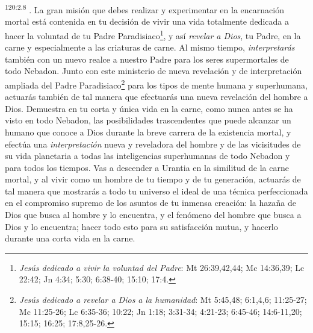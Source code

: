 \par 
\textsuperscript{120:2.8} . La gran misión que debes realizar y experimentar en la encarnación mortal está contenida en tu decisión de vivir una vida totalmente dedicada a hacer la voluntad de tu Padre Paradisiaco\footnote{\textit{Jesús dedicado a vivir la voluntad del Padre}: Mt 26:39,42,44; Mc 14:36,39; Lc 22:42; Jn 4:34; 5:30; 6:38-40; 15:10; 17:4.}, y así \textit{revelar a Dios}, tu Padre, en la carne y especialmente a las criaturas de carne. Al mismo tiempo, \textit{interpretarás} también con un nuevo realce a nuestro Padre para los seres supermortales de todo Nebadon. Junto con este ministerio de nueva revelación y de interpretación ampliada del Padre Paradisiaco\footnote{\textit{Jesús dedicado a revelar a Dios a la humanidad}: Mt 5:45,48; 6:1,4,6; 11:25-27; Mc 11:25-26; Lc 6:35-36; 10:22; Jn 1:18; 3:31-34; 4:21-23; 6:45-46; 14:6-11,20; 15:15; 16:25; 17:8,25-26.} para los tipos de mente humana y superhumana, actuarás también de tal manera que efectuarás una nueva revelación del hombre a Dios. Demuestra en tu corta y única vida en la carne, como nunca antes se ha visto en todo Nebadon, las posibilidades trascendentes que puede alcanzar un humano que conoce a Dios durante la breve carrera de la existencia mortal, y efectúa una \textit{interpretación} nueva y reveladora del hombre y de las vicisitudes de su vida planetaria a todas las inteligencias superhumanas de todo Nebadon y para todos los tiempos. Vas a descender a Urantia en la similitud de la carne mortal, y al vivir como un hombre de tu tiempo y de tu generación, actuarás de tal manera que mostrarás a todo tu universo el ideal de una técnica perfeccionada en el compromiso supremo de los asuntos de tu inmensa creación: la hazaña de Dios que busca al hombre y lo encuentra, y el fenómeno del hombre que busca a Dios y lo encuentra; hacer todo esto para su satisfacción mutua, y hacerlo durante una corta vida en la carne\guillemotright.

